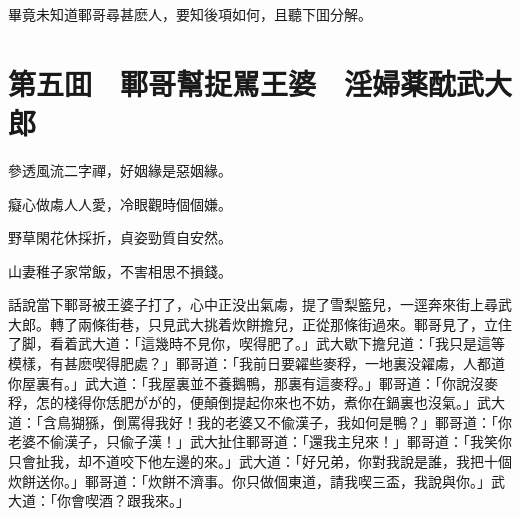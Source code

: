 畢竟未知道鄆哥尋甚麽人，要知後項如何，且聽下囬分解。

\chapter*{第五囬　鄆哥幫捉駡王婆　淫婦薬酖武大郎}

參透風流二字禪，好姻緣是惡姻緣。

癡心做䖏人人愛，冷眼觀時個個嫌。

野草閑花休採折，貞姿勁質自安然。

山妻稚子家常飯，不害相思不損錢。

話說當下鄆哥被王婆子打了，心中正没出氣䖏，提了雪梨籃兒，一逕奔來街上尋武大郎。轉了兩條街巷，只見武大挑着炊餅擔兒，正從那條街過來。鄆哥見了，立住了脚，看着武大道：「這幾時不見你，喫得肥了。」武大歇下擔兒道：「我只是這等模樣，有甚麽喫得肥處？」鄆哥道：「我前日要糴些麥稃，一地裏没糴䖏，人都道你屋裏有。」武大道：「我屋裏並不養鵝鴨，那裏有這麥稃。」鄆哥道：「你說沒麥稃，怎的棧得你恁肥がが的，便顛倒提起你來也不妨，煮你在鍋裏也沒氣。」武大道：「含鳥猢猻，倒罵得我好！我的老婆又不偸漢子，我如何是鴨？」鄆哥道：「你老婆不偷漢子，只偸子漢！」武大扯住鄆哥道：「還我主兒來！」鄆哥道：「我笑你只會扯我，却不道咬下他左邊的來。」武大道：「好兄弟，你對我說是誰，我把十個炊餅送你。」鄆哥道：「炊餅不濟事。你只做個東道，請我喫三盃，我說與你。」武大道：「你會喫酒？跟我來。」


